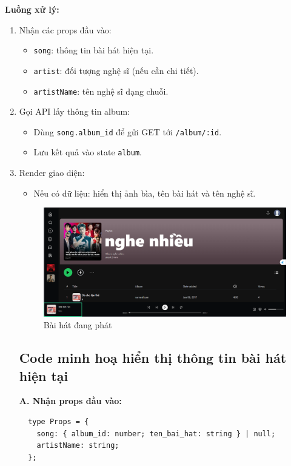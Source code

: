 \textbf{Luồng xử lý:}
\begin{enumerate}
  \item Nhận các props đầu vào:
  \begin{itemize}
    \item \texttt{song}: thông tin bài hát hiện tại.
    \item \texttt{artist}: đối tượng nghệ sĩ (nếu cần chi tiết).
    \item \texttt{artistName}: tên nghệ sĩ dạng chuỗi.
  \end{itemize}
  \item Gọi API lấy thông tin album:
  \begin{itemize}
    \item Dùng \texttt{song.album\_id} để gửi GET tới \texttt{/album/:id}.
    \item Lưu kết quả vào state \texttt{album}.
  \end{itemize}
  \item Render giao diện:
  \begin{itemize}
    \item Nếu có dữ liệu: hiển thị ảnh bìa, tên bài hát và tên nghệ sĩ.
  \end{itemize}
  \begin{figure}[H]
    \centering
    \includegraphics[width=1\textwidth]{imgs/trienkhaife/trackdisplay.png}
    \caption{Bài hát đang phát}
  \end{figure}
  \subsection*{Code minh hoạ hiển thị thông tin bài hát hiện tại}

  \textbf{A. Nhận props đầu vào:}
  \begin{verbatim}
  type Props = {
    song: { album_id: number; ten_bai_hat: string } | null;
    artistName: string;
  };
  \end{verbatim}
  

\end{enumerate}
